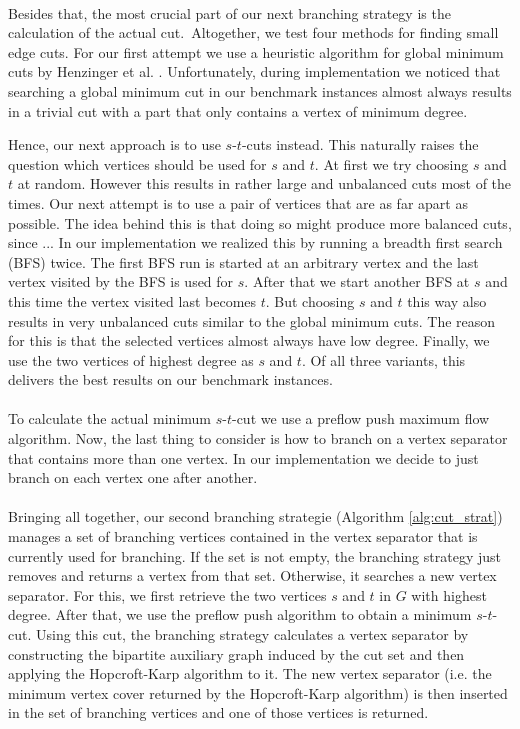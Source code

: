 \documentclass[]{article}
\begin{document}
\paragraph{}
Besides that, the most crucial part of our next branching strategy is the calculation of the actual cut.~Altogether, we test four methods for finding small edge cuts. For our first attempt we use a heuristic algorithm for global minimum cuts by Henzinger et al. \cite{bibid}. Unfortunately, during implementation we noticed that searching a global minimum cut in our benchmark instances almost always results in a trivial cut with a part that only contains a vertex of minimum degree.

Hence, our next approach is  to use $s$-$t$-cuts instead. This naturally raises the question which vertices should be used for $s$ and $t$. At first we try choosing $s$ and $t$ at random. However this results in rather large and unbalanced cuts most of the times. Our next attempt is to use a pair of vertices that are as far apart as possible. The idea behind this is that doing so might produce more balanced cuts, since ... In our implementation we realized this by running a breadth first search (BFS) twice. The first BFS run is started at an arbitrary vertex and the last vertex visited by the BFS is used for $s$. After that we start another BFS at $s$ and this time the vertex visited last becomes $t$. But choosing $s$ and $t$ this way also results in very unbalanced cuts similar to the global minimum cuts. The reason for this is that the selected vertices almost always have low degree. Finally, we use the two vertices of highest degree as $s$ and $t$. Of all three variants, this delivers the best results on our benchmark instances.

\paragraph{}
To calculate the actual minimum $s$-$t$-cut we use a preflow push maximum flow algorithm. Now, the last thing to consider is how to branch on a vertex separator that contains more than one vertex. In our implementation we decide to just branch on each vertex one after another.
\paragraph{}
Bringing all together, our second branching strategie (Algorithm \ref{alg:cut_strat}) manages a set of branching vertices contained in the vertex separator that is currently used for branching. If the set is not empty, the branching strategy just removes and returns a vertex from that set. Otherwise, it searches a new vertex separator. For this, we first retrieve the two vertices $s$ and $t$ in $G$ with highest degree. After that, we use the preflow push algorithm to obtain a minimum $s$-$t$-cut. Using this cut, the branching strategy calculates a vertex separator by constructing the bipartite auxiliary graph induced by the cut set and then applying the Hopcroft-Karp algorithm to it. The new vertex separator (i.e. the minimum vertex cover returned by the Hopcroft-Karp algorithm) is then inserted in the set of branching vertices and one of those vertices is returned.
\end{document}
